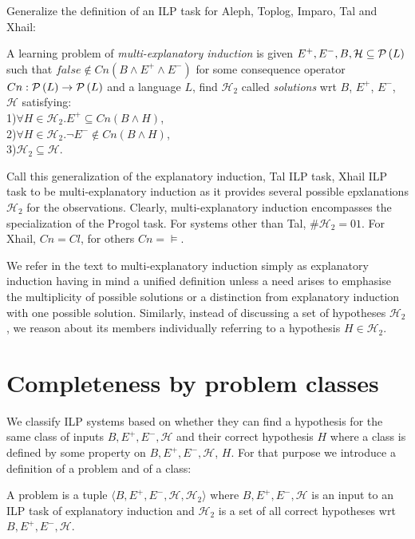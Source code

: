 Generalize the definition of an ILP task for Aleph, Toplog, Imparo, Tal and Xhail:

\begin{defn}A learning problem of \emph{multi-explanatory induction} is
given $E^{+}, E^{-}, B, \mathcal{H} \subseteq \mathcal{P} \left({ L }\right)$ such that $false \not\in Cn(B \land E^{+} \land E^{-})$ for some consequence operator $Cn:\mathcal{P} \left({ L }\right) \to \mathcal{P} \left({ L }\right)$ and a language $L$,
find $\mathcal{H}_2$ called \emph{solutions} wrt $B$, $E^+$, $E^-$, $\mathcal{H}$ satisfying:\\
1)$\forall H \in \mathcal{H}_2. E^{+} \subseteq Cn(B \land H)$,\\
2)$\forall H \in \mathcal{H}_2. \neg E^{-} \not\in Cn(B \land H)$,\\
3)$\mathcal{H}_2 \subseteq \mathcal{H}$.

\end{defn}
Call this generalization of the explanatory induction, Tal ILP task, Xhail ILP task to be multi-explanatory induction as it provides several possible  epxlanations $\mathcal{H}_2$ for the observations. Clearly, multi-explanatory induction encompasses the specialization of the Progol task. For systems other than Tal, $\#\mathcal{H}_2=01$. For Xhail, $Cn=Cl$, for others $Cn=\models$.

We refer in the text to multi-explanatory induction simply as explanatory induction having in mind a unified definition unless a need arises to emphasise the multiplicity of possible solutions or a distinction from explanatory induction with one possible solution. Similarly, instead of discussing a set of hypotheses $\mathcal{H}_2$, we reason about its members individually referring to a hypothesis $H \in \mathcal{H}_2$.
\section{Completeness by problem classes}\label{completeness_by_problem_classes}
We classify ILP systems based on whether they can find a hypothesis for the same class of inputs $B, E^+, E^-, \mathcal{H}$ and their correct hypothesis $H$ where a class is defined by some property on $B, E^+, E^-, \mathcal{H}$, $H$. For that purpose we introduce a definition of a problem and of a class:

\begin{defn}
A problem is a tuple $\langle B, E^+, E^-, \mathcal{H}, \mathcal{H}_2 \rangle$ where
$B, E^+, E^-, \mathcal{H}$ is an input to an ILP task of explanatory induction and $\mathcal{H}_2$ is a set of all correct hypotheses wrt $B, E^+, E^-, \mathcal{H}$.
\end{defn}

